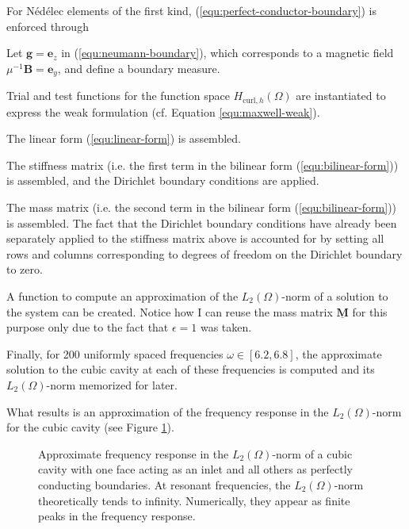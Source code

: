 \documentclass[11pt, a4paper]{article}
\begin{document}
For Nédélec elements of the first kind, (\ref{equ:perfect-conductor-boundary})
is enforced through


Let $\mathbf{g} = \mathbf{e}_z$ in (\ref{equ:neumann-boundary}), which corresponds
to a magnetic field $\mu^{-1} \mathbf{B} = \mathbf{e}_y$, and define a boundary
measure.


Trial and test functions for the function space $H_{\mathrm{curl},h}(\Omega)$ are
instantiated to express the weak formulation (cf. Equation \ref{equ:maxwell-weak}).


The linear form (\ref{equ:linear-form}) is assembled.


The stiffness matrix (i.e. the first term in the bilinear form (\ref{equ:bilinear-form}))
is assembled, and the Dirichlet boundary conditions are applied.


The mass matrix (i.e. the second term in the bilinear form (\ref{equ:bilinear-form}))
is assembled. The fact that the Dirichlet boundary conditions have already
been separately applied to the stiffness matrix above is accounted for by setting
all rows and columns corresponding to degrees of freedom on the Dirichlet
boundary to zero.


A function to compute an approximation of the $L_2(\Omega)$-norm of a solution
to the system can be created. Notice how I can reuse the mass matrix
$\mathbf{\underline{M}}$ for this purpose only due to the fact that
$\epsilon = 1$ was taken.


Finally, for 200 uniformly spaced frequencies $\omega \in [6.2, 6.8]$, the 
approximate solution to the cubic cavity at each of these frequencies is
computed and its $L_2(\Omega)$-norm memorized for later.


What results is an approximation of the frequency response in the $L_2(\Omega)$-norm
for the cubic cavity (see Figure \ref{fig:fenics-demonstration}). 
\begin{figure}[h]
    \centering
    
    \caption{Approximate frequency response in the $L_2(\Omega)$-norm of a cubic cavity with
    one face acting as an inlet and all others as perfectly conducting boundaries.
    At resonant frequencies, the $L_2(\Omega)$-norm theoretically tends to infinity.
    Numerically, they appear as finite peaks in the frequency response.}
    \label{fig:fenics-demonstration}
\end{figure}
\end{document}
